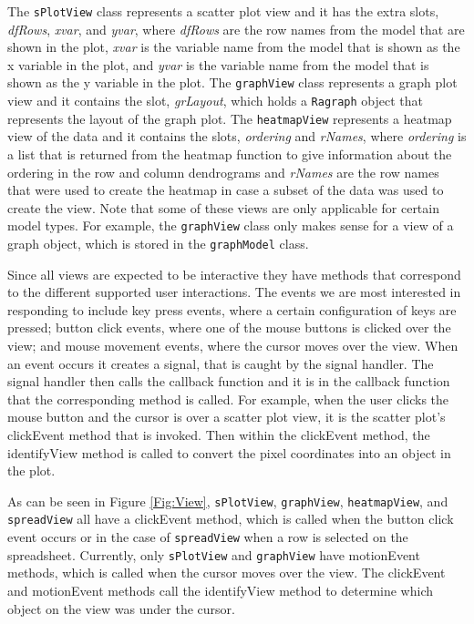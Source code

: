 \documentclass{article}[11pt]
\newcommand{\Rfunction}[1]{{\textsf{#1}}}
\newcommand{\Robject}[1]{{\texttt{#1}}}
\newcommand{\Rslot}[1]{\textsl{#1}}
\newcommand{\Rclass}[1]{\texttt{#1}}
\begin{document}
The \Rclass{sPlotView} class represents a scatter plot view and it has the
extra slots, \Rslot{dfRows}, \Rslot{xvar}, and \Rslot{yvar}, where
\Rslot{dfRows} are the row names from the model that are shown in the plot,
\Rslot{xvar} is the variable name from the model that is shown as the x
variable in the plot, and \Rslot{yvar} is the variable name from the model
that is shown as the y variable in the plot.  The \Rclass{graphView} class
represents a graph plot view and it contains the slot, \Rslot{grLayout}, which
holds a \Robject{Ragraph} object that represents the layout of the graph plot.
The \Rclass{heatmapView} represents a heatmap view of the data and it contains
the slots, \Rslot{ordering} and \Rslot{rNames}, where \Rslot{ordering} is a
list that is returned from the \Rfunction{heatmap} function to give
information about the ordering in the row and column dendrograms and
\Rslot{rNames} are the row names that were used to create the heatmap in case
a subset of the data was used to create the view.  Note that some of these
views are only applicable for certain model types.  For example, the
\Rclass{graphView} class only makes sense for a view of a graph object,
which is stored in the \Rclass{graphModel} class. 

Since all views are expected to be interactive they have methods that
correspond to the different supported user interactions.  The events
we are most interested in responding to include key press events,
where a certain configuration of keys are pressed; button click
events, where one of the mouse buttons is clicked over the view; and
mouse movement events, where the cursor moves over the view.  When an
event occurs it creates a signal, that is caught by the signal
handler.  The signal handler then calls the callback function and it
is in the callback function that the corresponding method is called.
For example, when the user clicks the mouse button and the cursor is
over a scatter plot view, it is the scatter plot's
\Rfunction{clickEvent} method that is invoked.  Then within the
\Rfunction{clickEvent} method, the \Rfunction{identifyView} method is called
to convert the pixel coordinates into an object in the plot.

As can be seen in Figure \ref{Fig:View}, \Robject{sPlotView},
\Robject{graphView}, \Robject{heatmapView}, and \Robject{spreadView} all have
a \Rfunction{clickEvent} method, which is called when the button click event
occurs or in the case of \Robject{spreadView} when a row is selected on the
spreadsheet. Currently, only \Robject{sPlotView} and \Robject{graphView} have
\Rfunction{motionEvent} methods, which is called when the cursor moves over
the view.  The \Rfunction{clickEvent} and \Rfunction{motionEvent} methods call
the \Rfunction{identifyView} method to determine which object on the view was
under the cursor.
\end{document}
